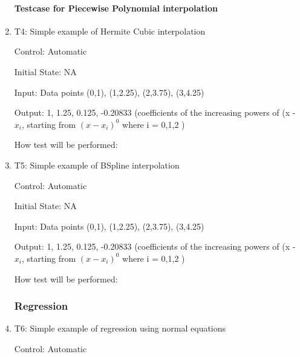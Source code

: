 \documentclass[12pt, titlepage]{article}
\begin{document}
\begin{enumerate}

\paragraph{Testcase for Piecewise Polynomial interpolation}

\item{T4: Simple example of Hermite Cubic interpolation \\}

Control: Automatic 

Initial State: NA

Input: Data points (0,1), (1,2.25), (2,3.75), (3,4.25)

Output: 1, 1.25, 0.125, -0.20833 (coefficients of the increasing powers of (x - $x_i$, starting from $(x - x_i)^{0}$ where i = 0,1,2 )

How test will be performed: 






\item{T5: Simple example of BSpline interpolation \\}

Control: Automatic 

Initial State: NA

Input: Data points (0,1), (1,2.25), (2,3.75), (3,4.25)

Output: 1, 1.25, 0.125, -0.20833 (coefficients of the increasing powers of (x - $x_i$, starting from $(x - x_i)^{0}$ where i = 0,1,2 )

How test will be performed: 




\subsubsection{Regression}

\item{T6: Simple example of regression using normal equations \\}

Control: Automatic 


\end{enumerate}
\end{document}
